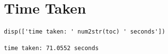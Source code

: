\section{Time Taken}

\color{RoyalPurple}\begin{verbatim}
disp(['time taken: ' num2str(toc) ' seconds'])
\end{verbatim}
\color{black}

        \begin{verbatim}time taken: 71.0552 seconds
\end{verbatim}
\color{black}
   